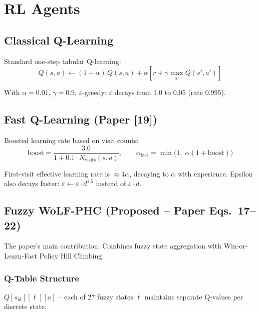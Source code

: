 \documentclass[11pt,a4paper]{article}
\begin{document}
\section{RL Agents}

\subsection{Classical Q-Learning}

Standard one-step tabular Q-learning:
\begin{equation}
Q(s, a) \leftarrow (1 - \alpha)\, Q(s, a) + \alpha \left[r + \gamma \max_{a'} Q(s', a')\right]
\end{equation}

With $\alpha = 0.01$, $\gamma = 0.9$, $\varepsilon$-greedy: $\varepsilon$ decays from 1.0 to 0.05 (rate 0.995).

\subsection{Fast Q-Learning (Paper [19])}

Boosted learning rate based on visit counts:
\begin{equation}
\text{boost} = \frac{3.0}{1 + 0.1 \cdot N_{\mathrm{visits}}(s,a)}, \qquad \alpha_{\mathrm{fast}} = \min\!\big(1,\; \alpha(1 + \text{boost})\big)
\end{equation}

First-visit effective learning rate is $\approx 4\alpha$, decaying to $\alpha$ with experience. Epsilon also decays faster: $\varepsilon \leftarrow \varepsilon \cdot d^{1.5}$ instead of $\varepsilon \cdot d$.

\subsection{Fuzzy WoLF-PHC (Proposed -- Paper Eqs.~17--22)}

The paper's main contribution. Combines fuzzy state aggregation with Win-or-Learn-Fast Policy Hill Climbing.

\subsubsection{Q-Table Structure}

$Q[s_{\mathrm{id}}][\ell][a]$ -- each of 27 fuzzy states $\ell$ maintains separate Q-values per discrete state.
\end{document}
